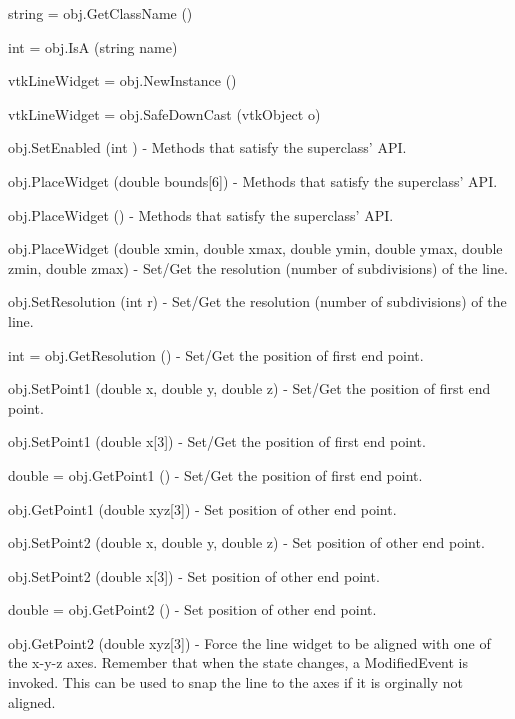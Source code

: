 \begin{DoxyItemize}
\item {\ttfamily string = obj.\-Get\-Class\-Name ()}  
\item {\ttfamily int = obj.\-Is\-A (string name)}  
\item {\ttfamily vtk\-Line\-Widget = obj.\-New\-Instance ()}  
\item {\ttfamily vtk\-Line\-Widget = obj.\-Safe\-Down\-Cast (vtk\-Object o)}  
\item {\ttfamily obj.\-Set\-Enabled (int )} -\/ Methods that satisfy the superclass' A\-P\-I.  
\item {\ttfamily obj.\-Place\-Widget (double bounds\mbox{[}6\mbox{]})} -\/ Methods that satisfy the superclass' A\-P\-I.  
\item {\ttfamily obj.\-Place\-Widget ()} -\/ Methods that satisfy the superclass' A\-P\-I.  
\item {\ttfamily obj.\-Place\-Widget (double xmin, double xmax, double ymin, double ymax, double zmin, double zmax)} -\/ Set/\-Get the resolution (number of subdivisions) of the line.  
\item {\ttfamily obj.\-Set\-Resolution (int r)} -\/ Set/\-Get the resolution (number of subdivisions) of the line.  
\item {\ttfamily int = obj.\-Get\-Resolution ()} -\/ Set/\-Get the position of first end point.  
\item {\ttfamily obj.\-Set\-Point1 (double x, double y, double z)} -\/ Set/\-Get the position of first end point.  
\item {\ttfamily obj.\-Set\-Point1 (double x\mbox{[}3\mbox{]})} -\/ Set/\-Get the position of first end point.  
\item {\ttfamily double = obj.\-Get\-Point1 ()} -\/ Set/\-Get the position of first end point.  
\item {\ttfamily obj.\-Get\-Point1 (double xyz\mbox{[}3\mbox{]})} -\/ Set position of other end point.  
\item {\ttfamily obj.\-Set\-Point2 (double x, double y, double z)} -\/ Set position of other end point.  
\item {\ttfamily obj.\-Set\-Point2 (double x\mbox{[}3\mbox{]})} -\/ Set position of other end point.  
\item {\ttfamily double = obj.\-Get\-Point2 ()} -\/ Set position of other end point.  
\item {\ttfamily obj.\-Get\-Point2 (double xyz\mbox{[}3\mbox{]})} -\/ Force the line widget to be aligned with one of the x-\/y-\/z axes. Remember that when the state changes, a Modified\-Event is invoked. This can be used to snap the line to the axes if it is orginally not aligned.  

\end{DoxyItemize}
